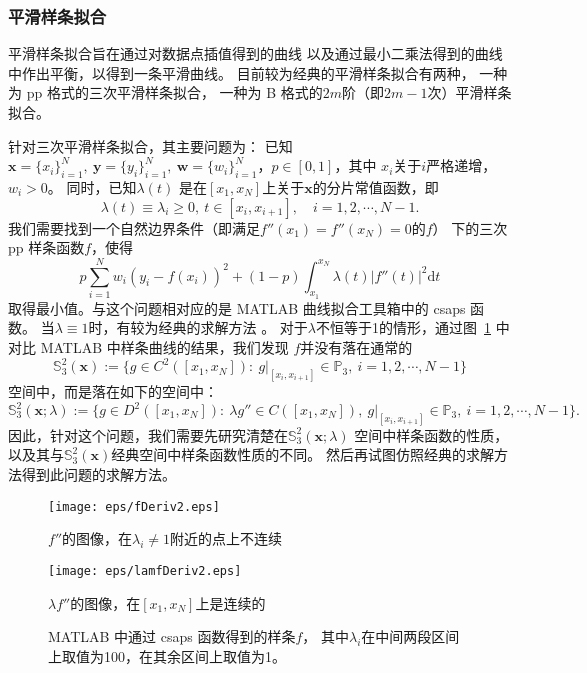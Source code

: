 \subsubsection{平滑样条拟合}
平滑样条拟合旨在通过对数据点插值得到的曲线
以及通过最小二乘法得到的曲线中作出平衡，以得到一条平滑曲线。
目前较为经典的平滑样条拟合有两种，
一种为 pp 格式的三次平滑样条拟合，
一种为 B 格式的$2m$阶（即$2m-1$次）平滑样条拟合。
  
针对三次平滑样条拟合，其主要问题为：
已知$\mathbf{x}=\{x_{i}\}_{i=1}^{N},\ \mathbf{y}=\{y_{i}\}_{i=1}^{N},
\ \mathbf{w}=\{w_{i}\}_{i=1}^{N}$，$p\in [0,1]$，其中
$x_{i}$关于$i$严格递增，$w_{i}>0$。
同时，已知$\lambda(t)$
是在$[x_{1},x_{N}]$上关于$\mathbf{x}$的分片常值函数，即
\begin{equation}
  \label{eq:lambdatx}
  \lambda(t)\equiv \lambda_{i}\ge 0,\
  t\in [x_{i},x_{i+1}],\quad i=1,2,\cdots,N-1.
\end{equation}
我们需要找到一个自然边界条件（即满足$f''(x_{1})=f''(x_{N})=0$的$f$）
下的三次 pp 样条函数$f$，使得
\begin{equation}
  \label{eq:cubicSmoothingSplinesFitting}
  p\sum_{i=1}^{N}w_{i}(y_{i}-f(x_{i}))^{2}+
  (1-p)\int_{x_{1}}^{x_{N}}\lambda(t)|f''(t)|^{2}\mathrm{d}t
\end{equation}
取得最小值。与这个问题相对应的是 MATLAB 曲线拟合工具箱中的 csaps 函数。
当$\lambda\equiv1$时，有较为经典的求解方法
\cite{GuideToSplines}。
对于$\lambda$不恒等于1的情形，通过图~\ref{fig:cubicSplinesSpaceCompare}
中对比 MATLAB 中样条曲线的结果，我们发现
$f$并没有落在通常的
\begin{equation}
  \label{eq:cubicSplinesSpace}
  \mathbb{S}_{3}^{2}(\mathbf{x}):=\{g\in C^{2}([x_{1},x_{N}]):
  \ g|_{[x_{i},x_{i+1}]}\in \mathbb{P}_{3},\ i=1,2,\cdots,N-1\}
\end{equation}
空间中，而是落在如下的空间中：
\begin{equation}
  \label{eq:cubicSplinesSpaceLambda}
  \mathbb{S}_{3}^{2}(\mathbf{x};\lambda)
  :=\{g\in D^{2}([x_{1},x_{N}]):
  \ \lambda g''\in C([x_{1},x_{N}]),
  \ g|_{[x_{i},x_{i+1}]}\in\mathbb{P}_{3},
  \ i=1,2,\cdots,N-1\}.
\end{equation}
因此，针对这个问题，我们需要先研究清楚在$\mathbb{S}_{3}^{2}(\mathbf{x};\lambda)$
空间中样条函数的性质，
以及其与$\mathbb{S}_{3}^{2}(\mathbf{x})$经典空间中样条函数性质的不同。
然后再试图仿照经典的求解方法得到此问题的求解方法。

\begin{figure}[h]  
  \centering   
  \begin{minipage}{0.42\textwidth}  
    \centering  
    \texttt{[image: eps/fDeriv2.eps]}  
    \caption*{$f''$的图像，在$\lambda_{i}\neq 1$附近的点上不连续}  
  \end{minipage}  
  \hfill  
  \begin{minipage}{0.42\textwidth}  
    \centering  
    \texttt{[image: eps/lamfDeriv2.eps]}  
    \caption*{$\lambda f''$的图像，在$[x_{1},x_{N}]$上是连续的}  
  \end{minipage}    
  \caption{ MATLAB 中通过 csaps 函数得到的样条$f$，
    其中$\lambda_{i}$在中间两段区间上取值为100，在其余区间上取值为1。}
  \label{fig:cubicSplinesSpaceCompare}  
\end{figure}

